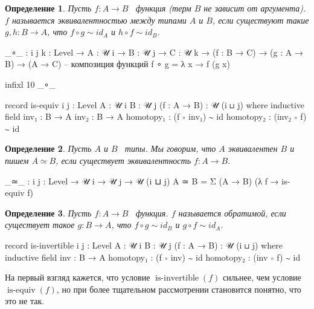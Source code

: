 \documentclass{article}[12pt]
\newtheorem{definition}{Определение}
\newcommand{\dash}{\textemdash\ }
\newcommand{\op}{\operatorname}
\begin{document}
\begin{definition}
    \label{EquivalenceDefinition}
    Пусть $f : A \rightarrow B$ \dash функция (терм $B$ не зависит от аргумента). $f$ называется
    эквивалентностью между типами $A$ и $B$, если существуют такие $g, h : B \rightarrow A$,
    что $f \circ g \sim id_A$ и $h \circ f \sim id_B$.
\end{definition}
\begin{code}
_∘_ : {i j k : Level} → {A : 𝒰 i} → {B : 𝒰 j} → {C : 𝒰 k}
      → (f : B → C) → (g : A → B)
      → (A → C) -- композиция функций
f ∘ g = λ x → f (g x)

infixl 10 _∘_

record is-equiv {i j : Level} {A : 𝒰 i} {B : 𝒰 j} (f : A → B) : 𝒰 (i ⊔ j) where
    inductive
    field
        inv₁ : B → A
        inv₂ : B → A
        homotopy₁ : (f ∘ inv₁) ∼ id
        homotopy₂ : (inv₂ ∘ f) ∼ id
\end{code}

\begin{definition}
    \label{TypeEquivalenceDefinition}
    Пусть $A$ и $B$ \dash типы. Мы говорим, что $A$ эквивалентен $B$ и пишем $A \simeq B$,
    если существует эквивалентность $f : A \rightarrow B$.
\end{definition}
\begin{code}
_≃_ : {i j : Level} → 𝒰 i → 𝒰 j → 𝒰 (i ⊔ j)
A ≃ B = Σ (A → B) (λ f → is-equiv f)
\end{code}

\begin{definition}
    \label{InvertibleDefinition}
    Пусть $f : A \rightarrow B$ \dash функция. $f$ называется обратимой, если существует такое 
    $g : B \rightarrow A$, что $f \circ g \sim id_B$ и $g \circ f \sim id_A$.
\end{definition}
\begin{code}
record is-invertible {i j : Level} {A : 𝒰 i} {B : 𝒰 j} (f : A → B) : 𝒰 (i ⊔ j) where
    inductive
    field
        inv : B → A
        homotopy₁ : (f ∘ inv) ∼ id
        homotopy₂ : (inv ∘ f) ∼ id
\end{code}

На первый взгляд кажется, что условие $\op{is-invertible}(f)$ сильнее, чем условие $\op{is-equiv}(f)$, но при более
тщательном рассмотрении становится понятно, что это не так.
\end{document}
